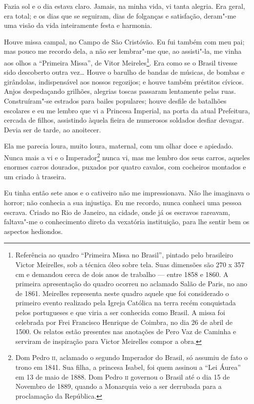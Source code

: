 Fazia sol e o dia estava claro. Jamais, na minha vida, vi tanta alegria.
Era geral, era total; e os dias que se seguiram, dias de folganças e
satisfação, deram"-me uma visão da vida inteiramente festa e harmonia.

Houve missa campal, no Campo de São Cristóvão. Eu fui também com meu
pai; mas pouco me recordo dela, a não ser lembrar"-me que, ao assisti"-la,
me vinha aos olhos a ``Primeira Missa'', de Vitor Meireles\footnote{Referência
  ao quadro ``Primeira Missa no Brasil'', pintado pelo brasileiro Victor
  Meirelles, sob a técnica óleo sobre tela. Suas dimensões são 270 x 357
  cm e demandou cerca de dois anos de trabalho --- entre 1858 e 1860. A
  primeira apresentação do quadro ocorreu no aclamado Salão de Paris, no
  ano de 1861. Meirelles representa neste quadro aquele que foi
  considerado o primeiro evento realizado pela Igreja Católica na terra
  recém conquistada pelos portugueses e que viria a ser conhecida como
  Brasil. A missa foi celebrada por Frei Francisco Henrique de Coimbra,
  no dia 26 de abril de 1500. Os relatos estão presentes nas anotações
  de Pero Vaz de Caminha e serviram de inspiração para Victor Meirelles
  compor a obra.}. Era como se o Brasil tivesse sido descoberto outra
vez\ldots{} Houve o barulho de bandas de músicas, de bombas e
girândolas, indispensável aos nossos regozijos; e houve também préstitos
cívicos. Anjos despedaçando grilhões, alegrias toscas passaram
lentamente pelas ruas. Construíram"-se estrados para bailes populares;
houve desfile de batalhões escolares e eu me lembro que vi a Princesa
Imperial, na porta da atual Prefeitura, cercada de filhos, assistindo
àquela fieira de numerosos soldados desfiar devagar. Devia ser de tarde,
ao anoitecer.

Ela me parecia loura, muito loura, maternal, com um olhar doce e
apiedado. Nunca mais a vi e o Imperador\footnote{Dom Pedro \textsc{ii}, aclamado
  o segundo Imperador do Brasil, só assumiu de fato o trono em 1841. Sua
  filha, a princesa Isabel, foi quem assinou a ``Lei Áurea'' em 13 de
  maio de 1888. Dom Pedro \textsc{ii} governou o Brasil até o dia 15 de Novembro
  de 1889, quando a Monarquia veio a ser derrubada para a proclamação da
  República.} nunca vi, mas me lembro dos seus carros, aqueles enormes
carros dourados, puxados por quatro cavalos, com cocheiros montados e um
criado à traseira.

Eu tinha então sete anos e o cativeiro não me impressionava. Não lhe
imaginava o horror; não conhecia a sua injustiça. Eu me recordo, nunca
conheci uma pessoa escrava. Criado no Rio de Janeiro, na cidade, onde já
os escravos rareavam, faltava"-me o conhecimento direto da vexatória
instituição, para lhe sentir bem os aspectos hediondos.

